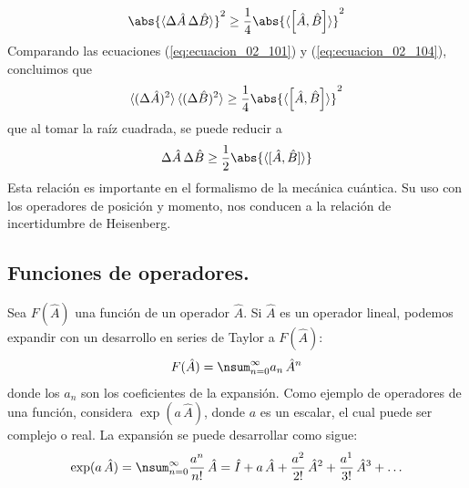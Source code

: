 \begin{align}
\abs{ \langle \Delta \hat{A} \, \Delta \hat{B} \rangle}^{2} \geq \dfrac{1}{4} \abs{\langle \left[ \hat{A}, \hat{B} \right] \rangle}^{2}
\label{eq:ecuacion_02_104}
\end{align}
Comparando las ecuaciones (\ref{eq:ecuacion_02_101}) y (\ref{eq:ecuacion_02_104}), concluimos que
\begin{align}
\langle (\Delta \hat{A})^{2} \rangle \, \langle (\Delta \hat{B})^{2} \rangle \geq \dfrac{1}{4} \abs{\langle \left[ \hat{A}, \hat{B} \right] \rangle}^{2}
\label{eq:ecuacion_02_105}
\end{align}
que al tomar la raíz cuadrada, se puede reducir a
\begin{align}
\Delta \hat{A} \, \Delta \hat{B} \geq \dfrac{1}{2} \abs{\langle [ \hat{A}, \hat{B} ] \rangle}
\label{eq:ecuacion_02_106}
\end{align}
Esta relación es importante en el formalismo de la mecánica cuántica. Su uso con los operadores de posición y momento, nos conducen a la relación de incertidumbre de Heisenberg.

\subsection{Funciones de operadores.}

Sea $F(\hat{A})$ una función de un operador $\hat{A}$. Si $\hat{A}$ es un operador lineal, podemos expandir con un desarrollo en series de Taylor a $F(\hat{A})$:
\begin{align}
F(\hat{A}) = \nsum_{n=0}^{\infty} a_{n} \, \hat{A}^{n}
\label{eq:ecuacion_02_108}
\end{align}
donde los $a_{n}$ son los coeficientes de la expansión. Como ejemplo de operadores de una función, considera $\exp(a \, \hat{A})$, donde $a$ es un escalar, el cual puede ser complejo o real. La expansión se puede desarrollar como sigue:
\begin{align}
\exp(a \, \hat{A}) = \nsum_{n=0}^{\infty} \dfrac{a^{n}}{n!} \, \hat{A} = \hat{I} + a \, \hat{A} + \dfrac{a^{2}}{2!} \, \hat{A}^{2} + \dfrac{a^{1}}{3!} \, \hat{A}^{3} + \ldots
\label{eq:ecuacion_02_109}
\end{align}
